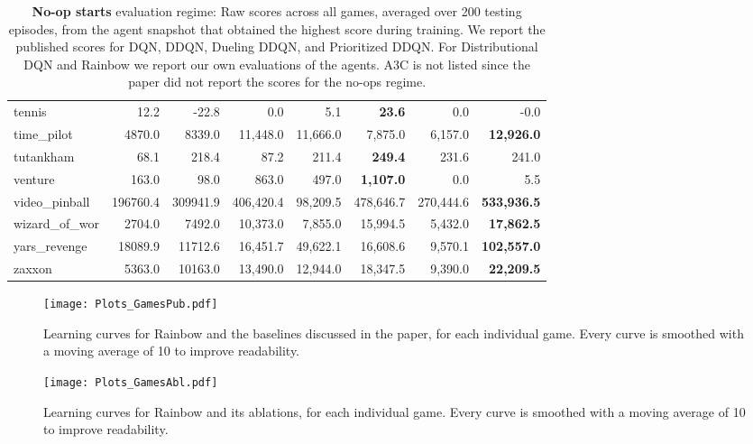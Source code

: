 \documentclass[letterpaper]{article} %
\begin{document}
\begin{table*}[t]
{\begin{tabular}{l|rrrrrrr}
            tennis &      12.2 &     -22.8 &         0.0 &        5.1 &          {\bf  23.6 }&        0.0 &       -0.0 \\
        time\_pilot &    4870.0 &    8339.0 &    11,448.0 &   11,666.0 &        7,875.0 &    6,157.0 & {\bf   12,926.0 }\\
         tutankham &      68.1 &     218.4 &        87.2 &      211.4 &         {\bf  249.4 }&      231.6 &      241.0 \\
           venture &     163.0 &      98.0 &       863.0 &      497.0 &    {\bf    1,107.0} &        0.0 &        5.5 \\
     video\_pinball &  196760.4 &  309941.9 &   406,420.4 &   98,209.5 &      478,646.7 &  270,444.6 &  {\bf 533,936.5}\\
     wizard\_of\_wor &    2704.0 &    7492.0 &    10,373.0 &    7,855.0 &       15,994.5 &    5,432.0 &   {\bf 17,862.5 }\\
      yars\_revenge &   18089.9 &   11712.6 &    16,451.7 &   49,622.1 &       16,608.6 &    9,570.1 &  {\bf 102,557.0 }\\
            zaxxon &    5363.0 &   10163.0 &    13,490.0 &   12,944.0 &       18,347.5 &    9,390.0 &  {\bf  22,209.5 }\\
\bottomrule
\end{tabular}
}
\caption{\textbf{No-op starts} evaluation regime: Raw scores across all games, averaged over 200 testing episodes, from the agent snapshot that obtained the highest score during training. We report the published scores for DQN, DDQN, Dueling DDQN, and Prioritized DDQN. For Distributional DQN and Rainbow we report our own evaluations of the agents. A3C is not listed since the paper did not report the scores for the no-ops regime.}
\label{tab:noop}
\end{table*}


\begin{figure*}
\centering
\texttt{[image: Plots\_GamesPub.pdf]}
\caption{Learning curves for Rainbow and the baselines discussed in the paper, for each individual game. Every curve is smoothed with a moving average of 10 to improve readability.}
\label{fig:published_individual}
\end{figure*}

\begin{figure*}
\centering
\texttt{[image: Plots\_GamesAbl.pdf]}
\caption{Learning curves for Rainbow and its ablations, for each individual game. Every curve is smoothed with a moving average of 10 to improve readability.}
\label{fig:ablations_individual}
\end{figure*}
\end{document}
